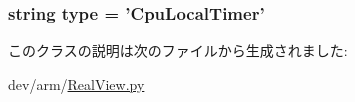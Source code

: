\label{classRealView_1_1CpuLocalTimer_ac9a716c5fa1dc45c2d9302efdab478f1}
\hypertarget{classRealView_1_1CpuLocalTimer_acce15679d830831b0bbe8ebc2a60b2ca}{
\subsubsection[{type}]{\setlength{\rightskip}{0pt plus 5cm}string {\bf type} = '{\bf CpuLocalTimer}'}}
\label{classRealView_1_1CpuLocalTimer_acce15679d830831b0bbe8ebc2a60b2ca}


このクラスの説明は次のファイルから生成されました:\begin{DoxyCompactItemize}
\item 
dev/arm/\hyperlink{RealView_8py}{RealView.py}\end{DoxyCompactItemize}
